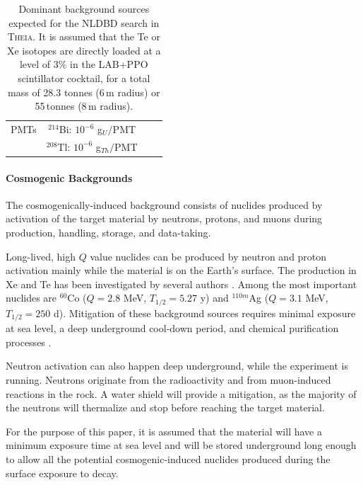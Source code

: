 \begin{table}[t]
\begin{tabular}{lccc}
PMTs                                        & $^{214}$Bi: $10^{-6}$ g$_{U}/$PMT            &                                               \\
                                            & $^{208}$Tl: $10^{-6}$ g$_{Th}/$PMT           &                                               \\
\bottomrule
\end{tabular}
\caption{Dominant background sources expected for the NLDBD search in
\textsc{Theia}. It is assumed that the Te or Xe isotopes are directly
loaded at a level of 3\% in the LAB+PPO scintillator cocktail, for a
total mass of 28.3 tonnes (6\,m radius) or 55\,tonnes (8\,m radius).}
\label{tab::bckg}
\end{table}

\paragraph{Cosmogenic Backgrounds}
The cosmogenically-induced background consists of nuclides produced by
activation of the target material by neutrons, protons, and muons during
production, handling, storage, and data-taking.

Long-lived, high $Q$ value nuclides can be produced by neutron and proton
activation mainly while the material is on the Earth's surface. The production
in Xe and Te has been investigated by several authors
\cite{mei09, baudis15, zhang16, norm05, bard97, wang15, lozza15}. Among
the most important nuclides are $^{60}$Co ($Q=2.8$ MeV, $T_{1/2}=5.27$ y) and
$^{110m}$Ag ($Q=3.1$ MeV, $T_{1/2}=250$ d). Mitigation of these background
sources requires minimal exposure at sea level, a deep underground cool-down
period, and chemical purification processes \cite{snop16}.

Neutron activation can also happen deep underground, while the experiment is
running. Neutrons originate from the radioactivity and from muon-induced
reactions in the rock. A water shield will provide a mitigation, as the
majority of the neutrons will thermalize and stop before reaching the target
material.

For the purpose of this paper, it is assumed that the material will have a
minimum exposure time at sea level and will be stored underground long
enough to allow all the potential cosmogenic-induced nuclides produced during
the surface exposure to decay.\\

